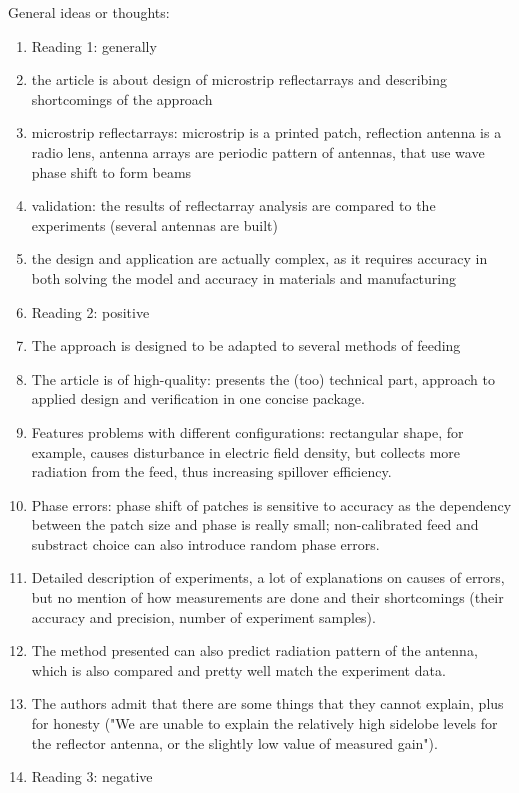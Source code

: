 \documentclass{article}
\begin{document}
    General ideas or thoughts:
    \begin{enumerate}
        \item Reading 1: generally
        \item the article is about design of microstrip reflectarrays and describing shortcomings of the approach
        \item microstrip reflectarrays: microstrip is a printed patch, reflection antenna is a radio lens, antenna arrays are periodic pattern of antennas, that use wave phase shift to form beams
        \item validation: the results of reflectarray analysis are compared to the experiments (several antennas are built)
        \item the design and application are actually complex, as it requires accuracy in both solving the model and accuracy in materials and manufacturing
        \item Reading 2: positive
        \item The approach is designed to be adapted to several methods of feeding
        \item The article is of high-quality: presents the (too) technical part, approach to applied design and verification in one concise package.
        \item Features problems with different configurations: rectangular shape, for example, causes disturbance in electric field density, but collects more radiation from the feed, thus increasing spillover efficiency.
        \item Phase errors: phase shift of patches is sensitive to accuracy as the dependency between the patch size and phase is really small; non-calibrated feed and substract choice can also introduce random phase errors.
        \item Detailed description of experiments, a lot of explanations on causes of errors, but no mention of how measurements are done and their shortcomings (their accuracy and precision, number of experiment samples).
        \item The method presented can also predict radiation pattern of the antenna, which is also compared and pretty well match the experiment data.
        \item The authors admit that there are some things that they cannot explain, plus for honesty ("We are unable to explain the relatively high sidelobe levels for the reflector antenna, or the slightly low value of measured gain").
        \item Reading 3: negative

\end{enumerate}
\end{document}
